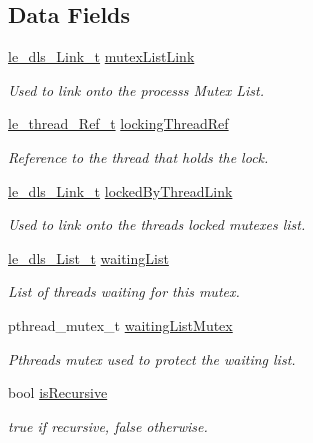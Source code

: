 \subsection*{Data Fields}
\begin{DoxyCompactItemize}
\item 
\hyperlink{structle__dls___link__t}{le\+\_\+dls\+\_\+\+Link\+\_\+t} \hyperlink{struct_mutex__t_a62232078de9e32a980db7251688cc5e2}{mutex\+List\+Link}
\begin{DoxyCompactList}\small\item\em Used to link onto the process\textquotesingle{}s Mutex List. \end{DoxyCompactList}\item 
\hyperlink{le__thread_8h_a32121104c6b4ca39008eb79a4d6862f2}{le\+\_\+thread\+\_\+\+Ref\+\_\+t} \hyperlink{struct_mutex__t_a0a86d36c24fefa083cece91d74fa2ee1}{locking\+Thread\+Ref}
\begin{DoxyCompactList}\small\item\em Reference to the thread that holds the lock. \end{DoxyCompactList}\item 
\hyperlink{structle__dls___link__t}{le\+\_\+dls\+\_\+\+Link\+\_\+t} \hyperlink{struct_mutex__t_a8b39ff447f12c63325fd61aec937e0d3}{locked\+By\+Thread\+Link}
\begin{DoxyCompactList}\small\item\em Used to link onto the thread\textquotesingle{}s locked mutexes list. \end{DoxyCompactList}\item 
\hyperlink{structle__dls___list__t}{le\+\_\+dls\+\_\+\+List\+\_\+t} \hyperlink{struct_mutex__t_a21dcb357f71b30a5b18605053488120b}{waiting\+List}
\begin{DoxyCompactList}\small\item\em List of threads waiting for this mutex. \end{DoxyCompactList}\item 
pthread\+\_\+mutex\+\_\+t \hyperlink{struct_mutex__t_a91d431e8425a4660419866d73128184b}{waiting\+List\+Mutex}
\begin{DoxyCompactList}\small\item\em Pthreads mutex used to protect the waiting list. \end{DoxyCompactList}\item 
bool \hyperlink{struct_mutex__t_abcb4902349befa90593a9fe0f1b868ab}{is\+Recursive}
\begin{DoxyCompactList}\small\item\em true if recursive, false otherwise. \end{DoxyCompactList}\item 

\end{DoxyCompactItemize}
